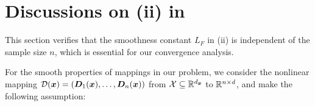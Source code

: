 \section{Discussions on (ii) in }

\label{Appendix: discussion on assumptions} 
This section verifies that the smoothness constant $L_F$ in (ii) is independent of the sample size $n$, which is essential for our convergence analysis.

For the smooth properties of mappings in our problem, we consider the nonlinear mapping
$\mathcal{D}(\bm{x}) = (\bm{D}_{1}(\bm{x}), \ldots, \bm{D}_{n}(\bm{x}))$ from $\mathcal{X}\subseteq
\mathbb{R}^{d_{\bm{x}}}$ to $\mathbb{R}^{n \times d}$, and make the following assumption:

